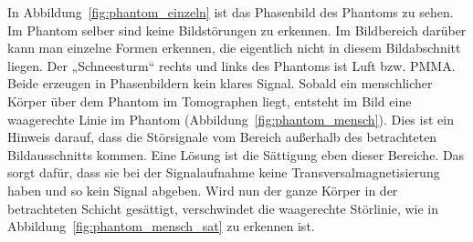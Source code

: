 \documentclass[
    11pt,
    ngerman
]{scrbook}
\begin{document}
In Abbildung~\ref{fig:phantom_einzeln} ist das Phasenbild des Phantoms zu
sehen. Im Phantom selber sind keine Bildstörungen zu erkennen. Im Bildbereich
darüber kann man einzelne Formen erkennen, die eigentlich nicht in diesem
Bildabschnitt liegen. Der „Schneesturm“ rechts und links des Phantoms ist Luft
bzw. PMMA. Beide erzeugen in Phasenbildern kein klares Signal. Sobald ein
menschlicher Körper über dem Phantom im Tomographen liegt, entsteht im Bild
eine waagerechte Linie im Phantom (Abbildung~\ref{fig:phantom_mensch}). Dies
ist ein Hinweis darauf, dass die Störsignale vom Bereich außerhalb des
betrachteten Bildausschnitts kommen. Eine Lösung ist die Sättigung eben dieser
Bereiche. Das sorgt dafür, dass sie bei der Signalaufnahme keine
Transversalmagnetisierung haben und so kein Signal abgeben. Wird nun der ganze
Körper in der betrachteten Schicht gesättigt, verschwindet die waagerechte
Störlinie, wie in Abbildung~\ref{fig:phantom_mensch_sat} zu erkennen ist.
\end{document}
